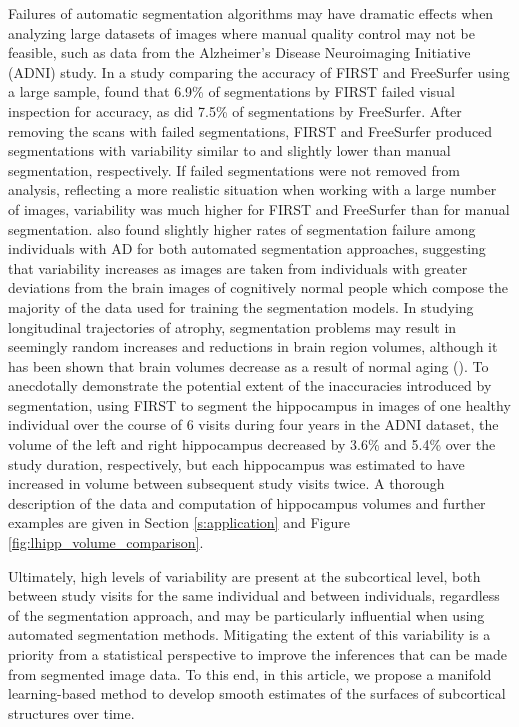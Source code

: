 \documentclass[12pt]{article}
\theoremstyle{definition}
\begin{document}
Failures of automatic segmentation algorithms may have dramatic effects when analyzing large datasets of images where manual quality control may not be feasible, such as data from the Alzheimer's Disease Neuroimaging Initiative (ADNI) study. In a study comparing the accuracy of FIRST and FreeSurfer using a large sample, \cite{mulderHippocampalVolumeChange2014} found that 6.9\% of segmentations by FIRST failed visual inspection for accuracy, as did 7.5\% of segmentations by FreeSurfer. After removing the scans with failed segmentations, FIRST and FreeSurfer produced segmentations with variability similar to and slightly lower than manual segmentation, respectively. If failed segmentations were not removed from analysis, reflecting a more realistic situation when working with a large number of images, variability was much higher for FIRST and FreeSurfer than for manual segmentation. \cite{mulderHippocampalVolumeChange2014} also found slightly higher rates of segmentation failure among individuals with AD for both automated segmentation approaches, suggesting that variability increases as images are taken from individuals with greater deviations from the brain images of cognitively normal people which compose the majority of the data used for training the segmentation models. In studying longitudinal trajectories of atrophy, segmentation problems may result in seemingly random increases and reductions in brain region volumes, although it has been shown that brain volumes decrease as a result of normal aging (\cite{scahill2003longitudinal}). To anecdotally demonstrate the potential extent of the inaccuracies introduced by segmentation, using FIRST to segment the hippocampus in images of one healthy individual over the course of 6 visits during four years in the ADNI dataset, the volume of the left and right hippocampus decreased by 3.6\% and 5.4\% over the study duration, respectively, but each hippocampus was estimated to have increased in volume between subsequent study visits twice. A thorough description of the data and computation of hippocampus volumes and further examples are given in Section \ref{s:application} and Figure \ref{fig:lhipp_volume_comparison}.

Ultimately, high levels of variability are present at the subcortical level, both between study visits for the same individual and between individuals, regardless of the segmentation approach, and may be particularly influential when using automated segmentation methods. Mitigating the extent of this variability is a priority from a statistical perspective to improve the inferences that can be made from segmented image data. To this end, in this article, we propose a manifold learning-based method to develop smooth estimates of the surfaces of subcortical structures over time.
\end{document}
